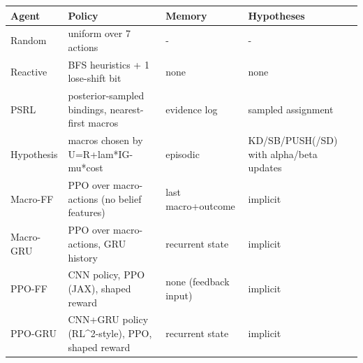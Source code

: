 \begin{tabular}{llll}
\toprule
Agent & Policy & Memory & Hypotheses \\
\midrule
Random & uniform over 7 actions & - & - \\
Reactive & BFS heuristics + 1 lose-shift bit & none & none \\
PSRL & posterior-sampled bindings, nearest-first macros & evidence log & sampled assignment \\
Hypothesis & macros chosen by U=R+lam*IG-mu*cost & episodic & KD/SB/PUSH(/SD) with alpha/beta updates \\
Macro-FF & PPO over macro-actions (no belief features) & last macro+outcome & implicit \\
Macro-GRU & PPO over macro-actions, GRU history & recurrent state & implicit \\
PPO-FF & CNN policy, PPO (JAX), shaped reward & none (feedback input) & implicit \\
PPO-GRU & CNN+GRU policy (RL\textasciicircum 2-style), PPO, shaped reward & recurrent state & implicit \\
\bottomrule
\end{tabular}
